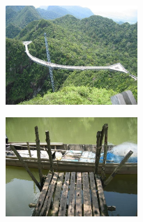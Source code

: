 \begin{multicols}{2}
\smallbreak
\hspace*{-0.65cm}
\includegraphics[width=5cm]{articles/langkawi/1212398042f2k1.jpg}
\smallbreak

\smallbreak
\hspace*{-0.65cm}
\includegraphics[width=5cm]{articles/langkawi/1212397931akoQ.jpg}
\smallbreak

\end{multicols}


